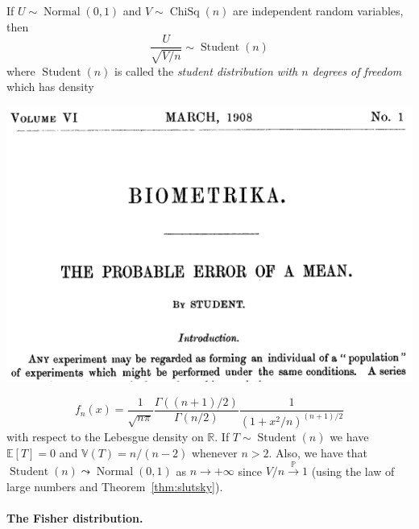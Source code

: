 \documentclass[
	fontsize=11pt, %
	twoside=false, %
	numbers=noenddot, %
]{kaobook}
\DeclareMathOperator{\chisq}{ChiSq}
\DeclareMathOperator{\nor}{Normal}
\DeclareMathOperator{\stu}{Student}
\renewcommand{\P}{\mathbb P}
\newcommand{\E}{\mathbb E}
\newcommand{\R}{\mathbb R}
\newcommand{\var}{\mathbb V}
\newcommand{\gopro}{\overset{\P}{\rightarrow}}
\newcommand{\gosto}{\leadsto}
\begin{document}
If $U \sim \nor(0, 1)$ and $V \sim \chisq(n)$ are independent random variables, then
\begin{equation}
	\label{eq:student-definition}
	\frac{U}{\sqrt{V / n}} \sim \stu(n)
\end{equation}
where $\stu(n)$ is called the \emph{student distribution with $n$ degrees of freedom}%
which has density%
\begin{marginfigure}
	\includegraphics{images/student.png}
\end{marginfigure}
\begin{equation*}
	f_n(x) = \frac{1}{\sqrt{n \pi}} \frac{\Gamma((n+1) / 2)}{\Gamma(n/2)} \frac{1}{(1 + x^2 / n)^{(n + 1)/2}}
\end{equation*}
with respect to the Lebesgue density on $\R$.
If $T \sim \stu(n)$ we have $\E[T] = 0$ and $\var(T) = n / (n - 2)$ whenever $n > 2$.
Also, we have that $\stu(n) \gosto \nor(0, 1)$ as $n \rightarrow +\infty$ since $V / n \gopro 1$ (using the law of large numbers and Theorem~\ref{thm:slutsky}).


\paragraph{The Fisher distribution.}
\end{document}
